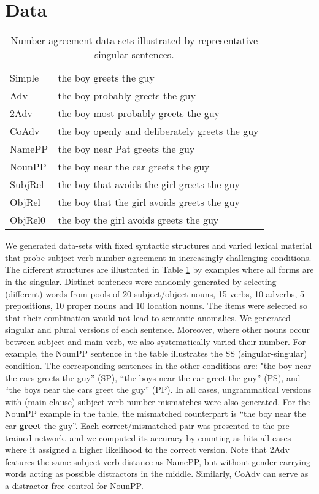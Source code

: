 \section{Data}

\begin{table}[tb]
  \centering
  \begin{footnotesize}
  \begin{tabular}{l@{\hskip1pt}l}
    \B Simple & the boy greets the guy\\
    \B Adv & the boy probably greets the guy\\
    \B 2Adv & the boy most probably greets the guy\\
    \B CoAdv &  the boy openly and deliberately greets the guy\\
    \B NamePP & the boy near Pat greets the guy\\
    \B NounPP & the boy near the car greets the guy\\
    \B SubjRel & the boy that avoids the girl greets the guy\\
    \B ObjRel  & the boy that the girl avoids greets the guy \\
    \B ObjRel0 &  the boy the girl avoids greets the guy\\
  \end{tabular}
  \end{footnotesize}
  \caption{Number agreement data-sets illustrated by representative
    singular sentences.}
  \label{tab:data-sets}
\end{table}

We generated data-sets with fixed syntactic structures and varied
lexical material that probe subject-verb number agreement in
increasingly challenging conditions. The different structures are
illustrated in Table \ref{tab:data-sets} by examples where all forms
are in the singular. Distinct sentences were randomly generated by
selecting (different) words from pools of 20 subject/object nouns, 15
verbs, 10 adverbs, 5 prepositions, 10 proper nouns and 10 location
nouns. The items were selected so that their combination would not
lead to semantic anomalies. We generated singular and plural
versions of each sentence. Moreover, where other nouns occur between
subject and main verb, we also systematically varied their number. For example, the
NounPP sentence in the table illustrates the SS (singular-singular)
condition. The corresponding sentences in the other conditions are:
"the boy near the cars greets the guy'' (SP), ``the boys near the car
greet the guy'' (PS), and ``the boys near the cars greet the guy''
(PP). In all cases, ungrammatical versions with (main-clause)
subject-verb number mismatches were also generated. For the NounPP
example in the table, the mismatched counterpart is ``the boy near
the car \textbf{greet} the guy''. Each correct/mismatched pair was
presented to the pre-trained network, and we computed its accuracy by
counting as hits all cases where it assigned a higher likelihood to
the correct version. Note that 2Adv features the same subject-verb
distance as NamePP, but without gender-carrying words acting as
possible distractors in the middle. Similarly, CoAdv can serve as a
distractor-free control for NounPP.

